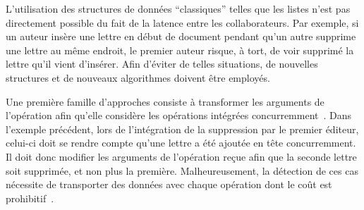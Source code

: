 %     


L'utilisation des structures de données ``classiques'' telles que les listes
n'est pas directement possible du fait de la latence entre les
collaborateurs. Par exemple, si un auteur insère une lettre en début de document
pendant qu'un autre supprime une lettre au même endroit, le premier auteur
risque, à tort, de voir supprimé la lettre qu'il vient d'insérer. Afin d'éviter
de telles situations, de nouvelles structures et de nouveaux algorithmes doivent
être employés.

Une première famille d'approches consiste à transformer les arguments de
l'opération afin qu'elle considère les opérations intégrées
concurremment~\cite{sun1998operational}. Dans l'exemple précédent, lors de
l'intégration de la suppression par le premier éditeur, celui-ci doit se rendre
compte qu'une lettre a été ajoutée en tête concurremment. Il doit donc modifier
les arguments de l'opération reçue afin que la seconde lettre soit supprimée, et
non plus la première. Malheureusement, la détection de ces cas nécessite de
transporter des données avec chaque opération dont le coût est
prohibitif~\cite{sun2009contextbased}.

